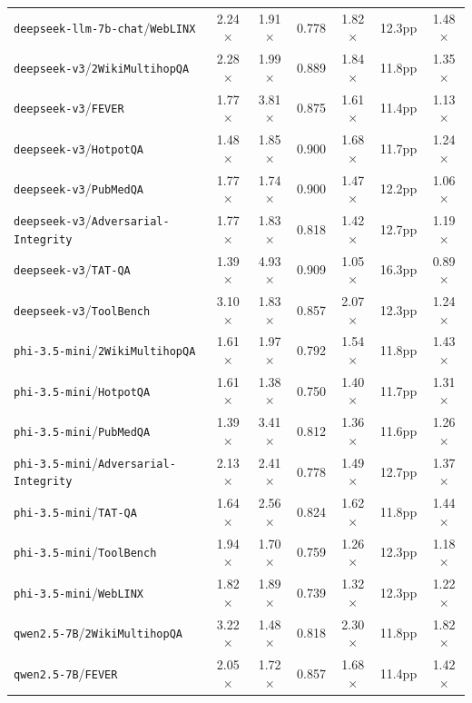 \begin{longtable}{lcccccc}
\texttt{deepseek-llm-7b-chat}/\texttt{WebLINX} & 2.24$\times$ & 1.91$\times$ & 0.778 & 1.82$\times$ & 12.3pp & 1.48$\times$ \\
\texttt{deepseek-v3}/\texttt{2WikiMultihopQA} & 2.28$\times$ & 1.99$\times$ & 0.889 & 1.84$\times$ & 11.8pp & 1.35$\times$ \\
\texttt{deepseek-v3}/\texttt{FEVER} & 1.77$\times$ & 3.81$\times$ & 0.875 & 1.61$\times$ & 11.4pp & 1.13$\times$ \\
\texttt{deepseek-v3}/\texttt{HotpotQA} & 1.48$\times$ & 1.85$\times$ & 0.900 & 1.68$\times$ & 11.7pp & 1.24$\times$ \\
\texttt{deepseek-v3}/\texttt{PubMedQA} & 1.77$\times$ & 1.74$\times$ & 0.900 & 1.47$\times$ & 12.2pp & 1.06$\times$ \\
\texttt{deepseek-v3}/\texttt{Adversarial-Integrity} & 1.77$\times$ & 1.83$\times$ & 0.818 & 1.42$\times$ & 12.7pp & 1.19$\times$ \\
\texttt{deepseek-v3}/\texttt{TAT-QA} & 1.39$\times$ & 4.93$\times$ & 0.909 & 1.05$\times$ & 16.3pp & 0.89$\times$ \\
\texttt{deepseek-v3}/\texttt{ToolBench} & 3.10$\times$ & 1.83$\times$ & 0.857 & 2.07$\times$ & 12.3pp & 1.24$\times$ \\
\texttt{phi-3.5-mini}/\texttt{2WikiMultihopQA} & 1.61$\times$ & 1.97$\times$ & 0.792 & 1.54$\times$ & 11.8pp & 1.43$\times$ \\
\texttt{phi-3.5-mini}/\texttt{HotpotQA} & 1.61$\times$ & 1.38$\times$ & 0.750 & 1.40$\times$ & 11.7pp & 1.31$\times$ \\
\texttt{phi-3.5-mini}/\texttt{PubMedQA} & 1.39$\times$ & 3.41$\times$ & 0.812 & 1.36$\times$ & 11.6pp & 1.26$\times$ \\
\texttt{phi-3.5-mini}/\texttt{Adversarial-Integrity} & 2.13$\times$ & 2.41$\times$ & 0.778 & 1.49$\times$ & 12.7pp & 1.37$\times$ \\
\texttt{phi-3.5-mini}/\texttt{TAT-QA} & 1.64$\times$ & 2.56$\times$ & 0.824 & 1.62$\times$ & 11.8pp & 1.44$\times$ \\
\texttt{phi-3.5-mini}/\texttt{ToolBench} & 1.94$\times$ & 1.70$\times$ & 0.759 & 1.26$\times$ & 12.3pp & 1.18$\times$ \\
\texttt{phi-3.5-mini}/\texttt{WebLINX} & 1.82$\times$ & 1.89$\times$ & 0.739 & 1.32$\times$ & 12.3pp & 1.22$\times$ \\
\texttt{qwen2.5-7B}/\texttt{2WikiMultihopQA} & 3.22$\times$ & 1.48$\times$ & 0.818 & 2.30$\times$ & 11.8pp & 1.82$\times$ \\
\texttt{qwen2.5-7B}/\texttt{FEVER} & 2.05$\times$ & 1.72$\times$ & 0.857 & 1.68$\times$ & 11.4pp & 1.42$\times$ \\

\end{longtable}
